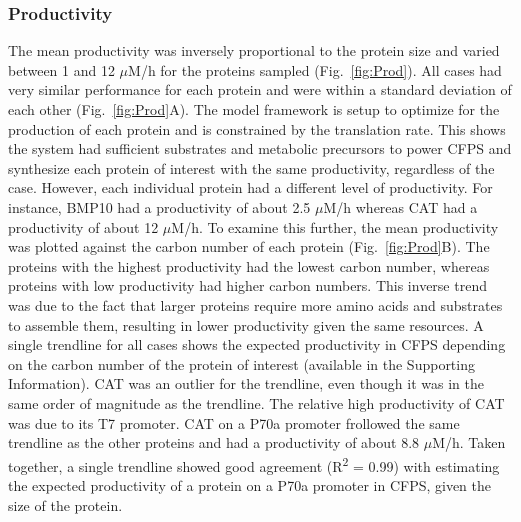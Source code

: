 \documentclass[journal=asbcd6,manuscript=article]{achemso}
\begin{document}
\subsubsection{Productivity}
The mean productivity was inversely proportional to the protein size and varied between 1 and 12 $\mu$M/h for the proteins sampled (Fig.~\ref{fig:Prod}).
All cases had very similar performance for each protein and were within a standard deviation of each other (Fig.~\ref{fig:Prod}A).
The model framework is setup to optimize for the production of each protein and is constrained by the translation rate.
This shows the system had sufficient substrates and metabolic precursors to power CFPS and synthesize each protein of interest with the same productivity, regardless of the case.
However, each individual protein had a different level of productivity.
For instance, BMP10 had a productivity of about 2.5 $\mu$M/h whereas CAT had a productivity of about 12 $\mu$M/h.
To examine this further, the mean productivity was plotted against the carbon number of each protein (Fig.~\ref{fig:Prod}B).
The proteins with the highest productivity had the lowest carbon number, whereas proteins with low productivity had higher carbon numbers.
This inverse trend was due to the fact that larger proteins require more amino acids and substrates to assemble them, resulting in lower productivity given the same resources.
A single trendline for all cases shows the expected productivity in CFPS depending on the carbon number of the protein of interest (available in the Supporting Information).
CAT was an outlier for the trendline, even though it was in the same order of magnitude as the trendline.
The relative high productivity of CAT was due to its T7 promoter.
CAT on a P70a promoter frollowed the same trendline as the other proteins and had a productivity of about 8.8 $\mu$M/h.
Taken together, a single trendline showed good agreement (R\textsuperscript{2} = 0.99) with estimating the expected productivity of a protein on a P70a promoter in CFPS, given the size of the protein.
\end{document}

